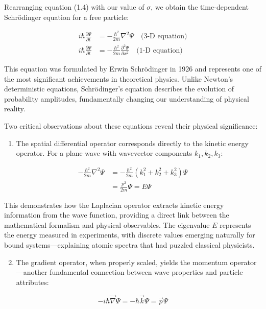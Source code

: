 \documentclass[10pt]{article}
\begin{document}
Rearranging equation (1.4) with our value of $\sigma$, we obtain the time-dependent Schrödinger equation for a free particle:

\begin{align*}
i \hbar \frac{\partial \Psi}{\partial t} & =-\frac{\hbar^{2}}{2 m} \nabla^{2} \Psi \quad \text{(3-D equation)} \\
i \hbar \frac{\partial \Psi}{\partial t} & =-\frac{\hbar^{2}}{2 m} \frac{\partial^{2} \Psi}{\partial x^{2}} \quad \text{(1-D equation)} \tag{1.7}
\end{align*}

This equation was formulated by Erwin Schrödinger in 1926 and represents one of the most significant achievements in theoretical physics. Unlike Newton's deterministic equations, Schrödinger's equation describes the evolution of probability amplitudes, fundamentally changing our understanding of physical reality.

Two critical observations about these equations reveal their physical significance:

\begin{enumerate}
  \item The spatial differential operator corresponds directly to the kinetic energy operator. For a plane wave with wavevector components $k_1, k_2, k_3$:
\end{enumerate}

\begin{align*}
-\frac{\hbar^{2}}{2 m} \nabla^{2} \Psi & =-\frac{\hbar^{2}}{2 m}\left(k_{1}^{2}+k_{2}^{2}+k_{3}^{2}\right) \Psi  \tag{1.8}\\
& =\frac{p^{2}}{2 m} \Psi=E \Psi
\end{align*}

This demonstrates how the Laplacian operator extracts kinetic energy information from the wave function, providing a direct link between the mathematical formalism and physical observables. The eigenvalue $E$ represents the energy measured in experiments, with discrete values emerging naturally for bound systems—explaining atomic spectra that had puzzled classical physicists.


\begin{enumerate}
  \setcounter{enumi}{1}
  \item The gradient operator, when properly scaled, yields the momentum operator—another fundamental connection between wave properties and particle attributes:
\end{enumerate}

\begin{equation*}
-i \hbar \vec{\nabla} \Psi=-\hbar \vec{k} \Psi=\vec{p} \Psi \tag{1.9}
\end{equation*}
\end{document}
